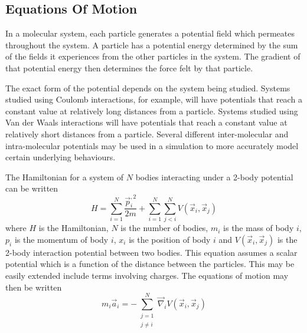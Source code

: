 \subsection{Equations Of Motion}

%
In a molecular system, each particle generates a potential field
which permeates throughout the system.
%
A particle has a potential energy determined by the sum
of the fields it experiences from the other particles in the system.
%
The gradient of that potential energy then determines
the force felt by that particle.

%
The exact form of the potential depends on the system being studied.
%
Systems studied using Coulomb interactions, for example,
will have potentials that reach a constant value at relatively long distances
from a particle.
%
Systems studied using Van der Waals interactions will have
potentials that reach a constant value at relatively short distances from
a particle.
%
Several different inter-molecular and intra-molecular potentials may be used
in a simulation to more accurately model certain underlying behaviours.


%
The Hamiltonian for a system of $N$ bodies
interacting under a 2-body potential can be written
\begin{equation}
    H = \sum_{i=1}^N \frac{\vec{p}_i^{,2}}{2 m}
        + \sum_{i=1}^N \sum_{j<i}^N V(\vec{x}_i, \vec{x}_j)
\end  {equation}
where $H$ is the Hamiltonian,
$N$ is the number of bodies,
$m_i$ is the mass of body $i$,
$p_i$ is the momentum of body $i$,
$x_i$ is the position of body $i$ and
$V(\vec{x}_i, \vec{x}_j)$ is the 2-body interaction potential
between two bodies.
%
This equation assumes a scalar potential which is
a function of the distance between the particles.
%
This may be easily extended include terms involving charges.
%
The equations of motion may then be written
\begin{equation}
    m_i \vec{a}_i = -\sum_{\substack{j=1\\j\ne{}i}}^N
                    \vec{\nabla}_i V(\vec{x}_i, \vec{x}_j)
\end  {equation}


